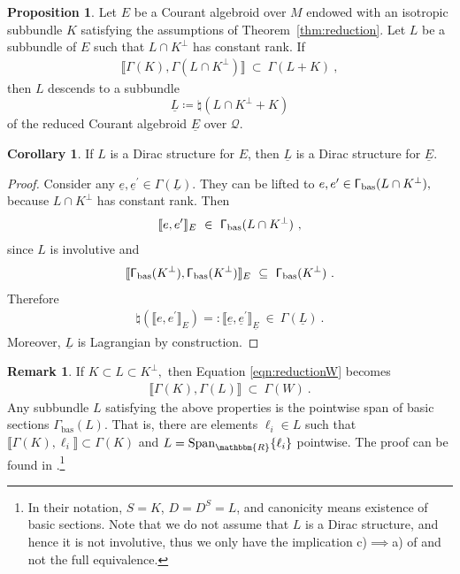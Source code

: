 \documentclass[a4paper, reqno, 11pt]{amsart}
\numberwithin{equation}{section}
\theoremstyle{definition}
\newtheorem{proposition}[equation]{Proposition}
\newtheorem{remark}[equation]{Remark}
\newtheorem{corollary}[equation]{Corollary}
\newcommand{\red}[1]{\underline{#1}}
\newcommand{\IR}{\mathbbm{R}}
\newcommand{\cQ}{{\mathcal Q}}
\theoremstyle{remark}
\begin{document}
\begin{proposition} \label{prop:reducedKsub-bundle}
 Let $E$ be a Courant algebroid over $M$ endowed with an isotropic subbundle $K$ satisfying the assumptions of Theorem~\ref{thm:reduction}. Let $L$ be a subbundle of $E$ such that $L \cap K^\perp$ has constant rank. If
 \begin{align} \label{eqn:reductionW}
 \llbracket \mathsf{\Gamma}(K) , \mathsf{\Gamma}(L \cap K^\perp) \rrbracket  \ \subset \ \mathsf{\Gamma}(L+K) \ ,  
 \end{align}
 then $L$ descends to a subbundle $$\red L \coloneqq \natural (L \cap K^\perp + K)$$ of the reduced Courant algebroid $\red E$ over $\cQ.$
\end{proposition}

\begin{corollary} \label{cor:Diracreduct}
If $L$ is a Dirac structure for $E$, then $\red L$ is a Dirac structure for $\red E$.
\end{corollary}

\begin{proof}
Consider any $\red e, {\red e}^\prime \in \mathsf{\Gamma}(\red L).$ They can be lifted to $e, e^\prime \in \mathsf{\Gamma}_{\rm bas}(L \cap K^\perp),$ because $L \cap K^\perp$ has constant rank. Then
\begin{align}
    \llbracket e, e^\prime \rrbracket_E \ \in \ \mathsf{\Gamma}_{\rm bas}(L \cap K^\perp) \ ,
\end{align}
since $L$ is involutive and 
\begin{align}
\llbracket\mathsf{\Gamma}_{\rm bas}(K^\perp), \mathsf{\Gamma}_{\rm bas}(K^\perp)  \rrbracket_E \ \subseteq \ \mathsf{\Gamma}_{\rm bas}(K^\perp) \ .
\end{align}
Therefore 
\begin{align} \label{eqn:reducedbracket}
\natural(\llbracket e, e^\prime \rrbracket_E) =: \llbracket \red e, {\red e}^\prime \rrbracket_{\red E} \ \in \ \mathsf{\Gamma}(\red L) \ .
\end{align}
Moreover, $\red L$ is Lagrangian by construction.
\end{proof}

\begin{remark}\label{rmk:reductedKsub-bundle}
If $K \subset L \subset K^\perp,$ then Equation \eqref{eqn:reductionW} becomes
\begin{align}
 \llbracket \mathsf{\Gamma}(K) , \mathsf{\Gamma}(L) \rrbracket   \ \subset \ \mathsf{\Gamma}(W) \ .    
\end{align}
Any subbundle $L$ satisfying the above properties is the pointwise span of basic sections $\mathsf{\Gamma}_{\mathrm{bas}}(L)$. That is, there are elements $\ell_i\in L$ such that $\llbracket\mathsf{\Gamma}(K),\ell_i\rrbracket \subset \mathsf{\Gamma}(K)$ and $L=\mathrm{Span}_\IR\lbrace \ell_i \rbrace$ pointwise. The proof can be found in \cite[Theorem 4.1]{calvo2010deformation}.\footnote{In their notation, $S=K$, $D=D^S=L$, and canonicity means existence of basic sections. Note that we do not assume that $L$ is a Dirac structure, and hence it is not involutive, thus we only have the implication c)$\implies$a) of  \cite[Theorem 4.1]{calvo2010deformation} and not the full equivalence.}
\end{remark}
\end{document}
